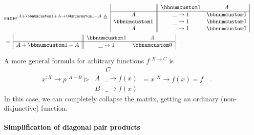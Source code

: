 ~\vspace{-1.4\baselineskip}
\begin{align*}
 & \text{same}^{:A+\bbnum 1+A\rightarrow\bbnum 1+A}\triangleq\,\begin{array}{|c||cc|}
 & \bbnum 1 & A\\
\hline A & \_\rightarrow1 & \bbnum 0\\
\bbnum 1 & \_\rightarrow1 & \bbnum 0\\
A & \_\rightarrow1 & \bbnum 0
\end{array}\\
 & =\,\begin{array}{|c||cc|}
 & \bbnum 1 & A\\
\hline A+\bbnum 1+A & \_\rightarrow1 & \bbnum 0
\end{array}\quad.
\end{align*}
\vspace{-1\baselineskip}

A more general formula for arbitrary functions $f^{:X\rightarrow C}$
is
\[
x^{:X}\rightarrow p^{:A+B}\triangleright\,\begin{array}{|c||c|}
 & C\\
\hline A & \_\rightarrow f(x)\\
B & \_\rightarrow f(x)
\end{array}\,=x^{:X}\rightarrow f(x)=f\quad.
\]
In this case, we can completely collapse the matrix, getting an ordinary
(non-disjunctive) function.

\paragraph{Simplification of diagonal pair products}

